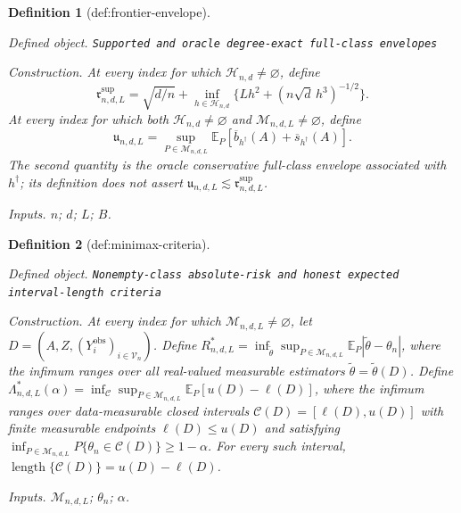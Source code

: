 \documentclass{article}
\newtheorem{definition}{Definition}
\begin{document}
\begin{definition}[def:frontier-envelope]\label{def:frontier-envelope}
\par\smallskip\noindent\emph{Defined object.} \texttt{Supported and oracle degree-\allowbreak{}exact full-\allowbreak{}class envelopes}
\par\smallskip\noindent\emph{Construction.} At every index for which \(\mathcal H_{n,d}\ne\varnothing\), define
\[
 \mathfrak r^{\mathrm{sup}}_{n,d,L}
 =\sqrt{d/n}+\inf_{h\in\mathcal H_{n,d}}
 \{Lh^2+(n\sqrt d\,h^3)^{-1/2}\}.
\]
At every index for which both \(\mathcal H_{n,d}\ne\varnothing\) and \(\mathcal M_{n,d,L}\ne\varnothing\), define
\[
 \mathfrak u_{n,d,L}
 =\sup_{P\in\mathcal M_{n,d,L}}
 \mathbb E_P[\overline b_{h^\dagger}(A)+\overline s_{h^\dagger}(A)].
\]
The second quantity is the oracle conservative full-class envelope associated with \(h^\dagger\); its definition does not assert \(\mathfrak u_{n,d,L}\lesssim\mathfrak r^{\mathrm{sup}}_{n,d,L}\).
\par\smallskip\noindent\emph{Inputs.} \(n\); \(d\); \(L\); \(B\).
\end{definition}

\begin{definition}[def:minimax-criteria]\label{def:minimax-criteria}
\par\smallskip\noindent\emph{Defined object.} \texttt{Nonempty-\allowbreak{}class absolute-\allowbreak{}risk and honest expected interval-\allowbreak{}length criteria}
\par\smallskip\noindent\emph{Construction.} At every index for which \(\mathcal M_{n,d,L}\ne\varnothing\), let \(D=(A,Z,(Y_i^{\mathrm{obs}})_{i\in\mathcal V_n})\). Define \(R^*_{n,d,L}=\inf_{\widetilde\theta}\sup_{P\in\mathcal M_{n,d,L}}\mathbb E_P|\widetilde\theta-\theta_n|\), where the infimum ranges over all real-valued measurable estimators \(\widetilde\theta=\widetilde\theta(D)\). Define \(\Lambda^*_{n,d,L}(\alpha)=\inf_{\mathcal C}\sup_{P\in\mathcal M_{n,d,L}}\mathbb E_P[u(D)-\ell(D)]\), where the infimum ranges over data-measurable closed intervals \(\mathcal C(D)=[\ell(D),u(D)]\) with finite measurable endpoints \(\ell(D)\leq u(D)\) and satisfying \(\inf_{P\in\mathcal M_{n,d,L}}P\{\theta_n\in\mathcal C(D)\}\geq1-\alpha\). For every such interval, \(\operatorname{length}\{\mathcal C(D)\}=u(D)-\ell(D)\).
\par\smallskip\noindent\emph{Inputs.} \(\mathcal M_{n,d,L}\); \(\theta_n\); \(\alpha\).
\end{definition}
\end{document}
